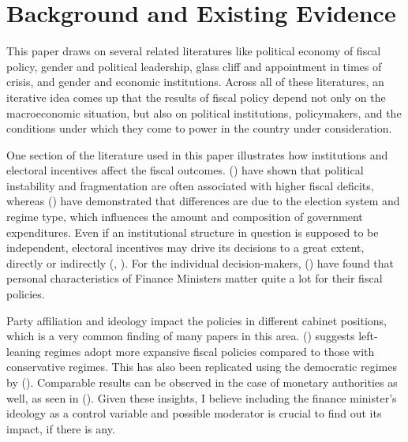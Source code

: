 \documentclass[12pt]{article}
\renewcommand{\citet}[1]{\textit{\citeauthor{#1}} (\citeyear{#1})}
\renewcommand{\citep}[1]{(\textit{\citeauthor{#1}}, \citeyear{#1})}
\begin{document}
\section{Background and Existing Evidence}
\label{sec:background}

This paper draws on several related literatures like political economy of fiscal policy, gender and political leadership, glass cliff and appointment in times of crisis, and gender and economic institutions. Across all of these literatures, an iterative idea comes up that the results of fiscal policy depend not only on the macroeconomic situation, but also on political institutions, policymakers, and the conditions under which they come to power in the country under consideration.

One section of the literature used in this paper illustrates how institutions and electoral incentives affect the fiscal outcomes. \citet{alesina1997} have shown that political instability and fragmentation are often associated with higher fiscal deficits, whereas \citet{persson2002} have demonstrated that differences are due to the election system and regime type, which influences the amount and composition of government expenditures. Even if an institutional structure in question is supposed to be independent, electoral incentives may drive its decisions to a great extent, directly or indirectly \citep{beck1987}. For the individual decision-makers, \citet{moessinger2012} have found that personal characteristics of Finance Ministers matter quite a lot for their fiscal policies.

Party affiliation and ideology impact the policies in different cabinet positions, which is a very common finding of many papers in this area. \citet{hibbs1977} suggests left-leaning regimes adopt more expansive fiscal policies compared to those with conservative regimes. This has also been replicated using the democratic regimes by \citet{potrafke2011a}. Comparable results can be observed in the case of monetary authorities as well, as seen in \citet{vanommeren2021}. Given these insights, I believe including the finance minister's ideology as a control variable and possible moderator is crucial to find out its impact, if there is any.
\end{document}
